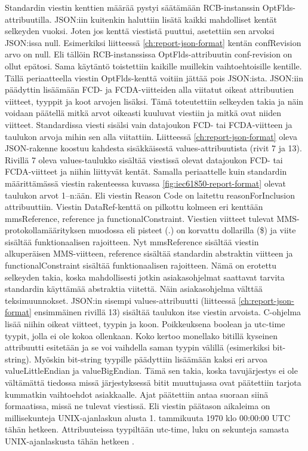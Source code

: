 Standardin viestin kenttien määrää pystyi säätämään RCB-instanssin OptFlds-attribuutilla. JSON:iin kuitenkin haluttiin lisätä kaikki mahdolliset kentät selkeyden vuoksi. Joten jos kenttä viestistä puuttui, asetettiin sen arvoksi JSON:issa null. Esimerkiksi liitteessä \ref{ch:report-json-format} kentän confRevision arvo on null. Eli tällöin RCB-instanssissa OptFlds-attribuutin conf-revision on ollut epätosi. Sama käytäntö toistettiin kaikille muillekin vaihtoehtoisille kentille. Tällä periaatteella viestin OptFlds-kenttä voitiin jättää pois JSON:ista. JSON:iin päädyttin lisäämään FCD- ja FCDA-viitteiden alla viitatut oikeat attribuutien viitteet, tyyppit ja koot arvojen lisäksi. Tämä toteutettiin selkeyden takia ja näin voidaan päätellä mitkä arvot oikeasti kuuluvat viestiin ja mitkä ovat niiden viitteet. Standardissa viesti sisälsi vain datajoukon FCD- tai FCDA-viitteen ja taulukon arvoja mihin sen alla viitattiin. Liitteessä \ref{ch:report-json-format} oleva JSON-rakenne koostuu kahdesta sisäkkäisestä values-attribuutista (rivit 7 ja 13). Rivillä 7 oleva values-taulukko sisältää viestissä olevat datajoukon FCD- tai FCDA-viitteet ja niihin liittyvät kentät. Samalla periaattelle kuin standardin määrittämässä viestin rakenteessa kuvassa \ref{fig:iec61850-report-format} olevat taulukon arvot 1--n:ään. Eli viestin Reason Code on laitettu reasonForInclusion attribuuttiin. Viestin DataRef-kenttä on pilkottu kolmeen eri kenttään mmsReference, reference ja functionalConstraint. Viestien viitteet tulevat MMS-protokollamäärityksen muodossa eli pisteet (.) on korvattu dollarilla (\$) ja viite sisältää funktionaalisen rajoitteen. Nyt mmsReference sisältää viestin alkuperäisen MMS-viitteen, reference sisältää standardin abstraktin viitteen ja functionalConstraint sisältää funktionaalisen rajoitteen. Nämä on erotettu selkeyden takia, koska mahdollisesti jotkin asiakasohjelmat saattavat tarvita standardin käyttämää abstraktia viitettä. Näin asiakasohjelma välttää teksimuunnokset. JSON:in sisempi values-attribuutti (liitteessä \ref{ch:report-json-format} ensimmäinen rivillä 13) sisältää taulukon itse viestin arvoista. C-ohjelma lisää niihin oikeat viitteet, tyypin ja koon. Poikkeuksena boolean ja utc-time tyypit, jolla ei ole kokoa ollenkaan. Koko kertoo monellako bitillä kyseinen attribuutti esitetään ja se voi vaihdella saman tyypin välillä (esimerkiksi bit-string). Myöskin bit-string tyypille päädyttiin lisäämään kaksi eri arvoa valueLittleEndian ja valueBigEndian. Tämä sen takia, koska tavujärjestys ei ole vältämättä tiedossa missä järjestyksessä bitit muuttujassa ovat päätettiin tarjota kummatkin vaihtoehdot asiakkaalle. Ajat päätettiin antaa suoraan siinä formaatissa, missä ne tulevat viestissä. Eli viestin päätason aikaleima on millisekunteja UNIX-ajanlaskun alusta 1. tammikuuta 1970 klo 00:00:00 UTC tähän hetkeen. Attribuuteissa tyypiltään utc-time, luku on sekunteja samasta UNIX-ajanlaskusta tähän hetkeen \mbox{\cite[s.~26--27]{IEC61850-7-2}}.